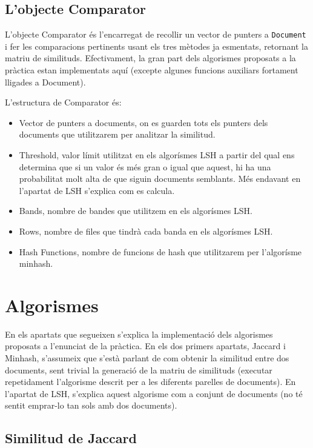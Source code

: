\documentclass[catalan, 12pt]{report}
\begin{document}
\subsection{L'objecte Comparator}

L'objecte Comparator és l'encarregat de recollir un vector de punters a \verb|Document| i fer les comparacions pertinents usant els tres mètodes ja esmentats, retornant la matriu de similituds. Efectivament, la gran part dels algorismes proposats a la pràctica estan implementats aquí (excepte algunes funcions auxiliars fortament lligades a Document).\newline

L'estructura de Comparator és:

\begin{itemize}
\item Vector de punters a documents, on es guarden tots els punters dels documents que utilitzarem per analitzar la similitud.
\item Threshold, valor límit utilitzat en els algorísmes LSH a partir del qual ens determina que si un valor és més gran o igual que aquest, hi ha una probabilitat molt alta de que siguin documents semblants. Més endavant en l'apartat de LSH s'explica com es calcula.
\item Bands, nombre de bandes que utilitzem en els algorísmes LSH.
\item Rows, nombre de files que tindrà cada banda en els algorísmes LSH.
\item Hash Functions, nombre de funcions de hash que utilitzarem per l'algorísme minhash.
\end{itemize}

\section{Algorismes}

En els apartats que segueixen s'explica la implementació dels algorismes proposats a l'enunciat de la pràctica. En els dos primers apartats, Jaccard i Minhash, s'assumeix que s'està parlant de com obtenir la similitud entre dos documents, sent trivial la generació de la matriu de similituds (executar repetidament l'algorisme descrit per a les diferents parelles de documents). En l'apartat de LSH, s'explica aquest algorisme com a conjunt de documents (no té sentit emprar-lo tan sols amb dos documents).

\subsection{Similitud de Jaccard}
\end{document}
